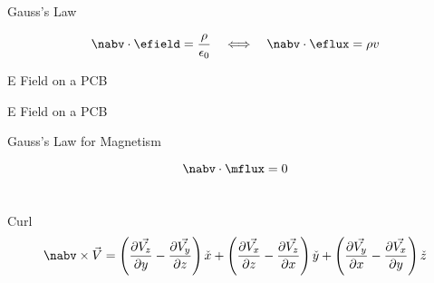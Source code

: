 \begin{frame}{Gauss's Law}
    \begin{twocolumns}[0.5]
    \leftcol
        \vspace{-8pt}
        \begin{equation}
            \nabv \cdot \efield = \frac{\rho}{\epsilon_0}
            \hspace{1em} \Longleftrightarrow \hspace{1.0em}
            \nabv \cdot \eflux = \rho v
        \end{equation}
    \rightcol
    \end{twocolumns}
\end{frame}
 
\begin{frame}{E Field on a PCB}
    \vspace{-20pt}
\end{frame}

\begin{frame}{E Field on a PCB}
    \vspace{-20pt}
\end{frame}

\begin{frame}{Gauss's Law for Magnetism}
    \begin{twocolumns}[0.35]
        \leftcol
            \vspace{-8pt}
            \begin{equation}
                \nabv \cdot \mflux = 0
            \end{equation}\\
            \vspace{10pt}
        \rightcol
    \end{twocolumns}
\end{frame}


\begin{frame}{Curl}
    \begin{equation}
        \nabv \times \vec{V} = \left(\frac{\partial\vec{V_z}}{\partial y}-\frac{\partial\vec{V_y}}{\partial z} \right) \check{x} +
        \left(\frac{\partial\vec{V_x}}{\partial z}-\frac{\partial\vec{V_z}}{\partial x} \right) \check{y} +
        \left(\frac{\partial\vec{V_y}}{\partial x}-\frac{\partial\vec{V_x}}{\partial y} \right) \check{z}
    \end{equation}
    \vspace{-15pt}
\begin{twocolumns}[0.5]
    \leftcol
    \rightcol
 \end{twocolumns}
\end{frame}

